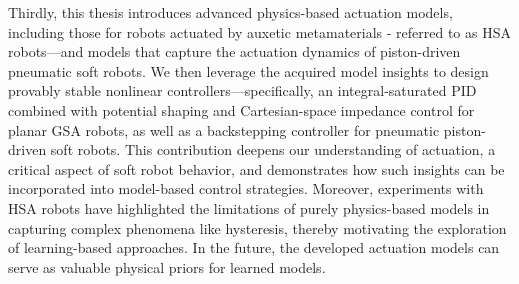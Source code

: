 Thirdly, this thesis introduces advanced physics-based actuation models, including those for robots actuated by auxetic metamaterials - referred to as HSA robots—and models that capture the actuation dynamics of piston-driven pneumatic soft robots. We then leverage the acquired model insights to design provably stable nonlinear controllers—specifically, an integral-saturated PID combined with potential shaping and Cartesian-space impedance control for planar GSA robots, as well as a backstepping controller for pneumatic piston-driven soft robots. This contribution deepens our understanding of actuation, a critical aspect of soft robot behavior, and demonstrates how such insights can be incorporated into model-based control strategies. Moreover, experiments with HSA robots have highlighted the limitations of purely physics-based models in capturing complex phenomena like hysteresis, thereby motivating the exploration of learning-based approaches. In the future, the developed actuation models can serve as valuable physical priors for learned models.

